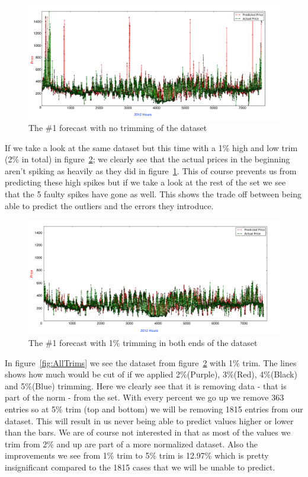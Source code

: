 \begin{figure}[H]
\centering
\includegraphics[width=\linewidth,natwidth=898,natheight=587]{billeder/PriceExperimentalAnalysis/NoTrimming.png}
\caption{The \#1 forecast with no trimming of the dataset}
\label{fig:NoTrim}
\end{figure}

If we take a look at the same dataset but this time with a 1\% high and low trim (2\% in total) in figure~\ref{fig:1PTrim}; we clearly see that the actual prices in the beginning aren't spiking as heavily as they did in figure~\ref{fig:NoTrim}. This of course prevents us from predicting these high spikes but if we take a look at the rest of the set we see that the 5 faulty spikes have gone as well. This shows the trade off between being able to predict the outliers and the errors they introduce.

\begin{figure}[H]
\centering
\includegraphics[width=\linewidth,natwidth=898,natheight=587]{billeder/PriceExperimentalAnalysis/1PTrim.png}
\caption{The \#1 forecast with 1\% trimming in both ends of the dataset}
\label{fig:1PTrim}
\end{figure}

In figure~\ref{fig:AllTrims} we see the dataset from figure~\ref{fig:1PTrim} with 1\% trim. The lines shows how much would be cut of if we applied 2\%(Purple), 3\%(Red), 4\%(Black) and 5\%(Blue) trimming. Here we clearly see that it is removing data - that is part of the norm - from the set. With every percent we go up we remove 363 entries so at 5\% trim (top and bottom) we will be removing 1815 entries from our dataset. This will result in us never being able to predict values higher or lower than the bars. We are of course not interested in that as most of the values we trim from 2\% and up are part of a more normalized dataset. Also the improvements we see from 1\% trim to 5\% trim is 12.97\% which is pretty insignificant compared to the 1815 cases that we will be unable to predict.

